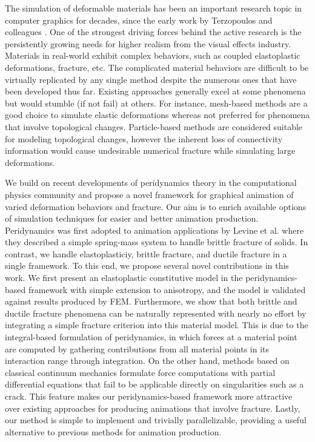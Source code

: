 The simulation of deformable materials has been an important research topic in computer graphics for decades, since the early work by Terzopoulos and colleagues \cite{Terzopoulos:1987:EDM:37402.37427}. One of the strongest driving forces behind the active research is the persistently growing needs for higher realism from the visual effects industry. Materials in real-world exhibit complex behaviors, such as coupled elastoplastic deformations, fracture, etc. The complicated material behaviors are difficult to be virtually replicated by any single method despite the numerous ones that have been developed thus far. Existing approaches generally excel at some phenomena but would stumble (if not fail) at others. For instance, mesh-based methods \cite{Muller:2004:IVM:1006058.1006087,Irving:2004:IFE:1028523.1028541,Teran:2005:RQF:1073368.1073394,Sifakis:2012:FSD:2343483.2343501} are a good choice to simulate elastic deformations whereas not preferred for phenomena that involve topological changes. Particle-based methods \cite{Muller:2003:PFS:846276.846298,Pauly:2005:MAF:1073204.1073296,Stomakhin:2013:MPM:2461912.2461948} are considered suitable for modeling topological changes, however the inherent loss of connectivity information would cause undesirable numerical fracture \cite{Liu:2011:AKM:2065362.2066108, Zhu:2016MPM} while simulating large deformations.

We build on recent developments of peridynamics theory in the computational physics community \cite{Silling2000,silling2007peridynamic,mitchell2011nonlocal, emmrich2013peridynamics,madenci2014peridynamic} and propose a novel framework for graphical animation of varied deformation behaviors and fracture. Our aim is to enrich available options of simulation techniques for easier and better animation production. Peridynamics was first adopted to animation applications by Levine et al. \cite{Levine:2015:PPS:2849517.2849526} where they described a simple spring-mass system to handle brittle fracture of solids. In contrast, we handle elastoplasticiy, brittle fracture, and ductile fracture in a single framework. To this end, we propose several novel contributions in this work. We first present an elastoplastic constitutive model in the peridynamics-based framework with simple extension to anisotropy, and the model is validated against results produced by FEM. Furthermore, we show that both brittle and ductile fracture phenomena can be naturally represented with nearly no effort by integrating a simple fracture criterion into this material model. This is due to the integral-based formulation of peridynamics, in which forces at a material point are computed by gathering contributions from all material points in its interaction range through integration. On the other hand, methods based on classical continuum mechanics formulate force computations with partial differential equations that fail to be applicable directly on singularities such as a crack. This feature makes our peridynamics-based framework more attractive over existing approaches for producing animations that involve fracture. Lastly, our method is simple to implement and trivially parallelizable, providing a useful alternative to previous methods for animation production.

